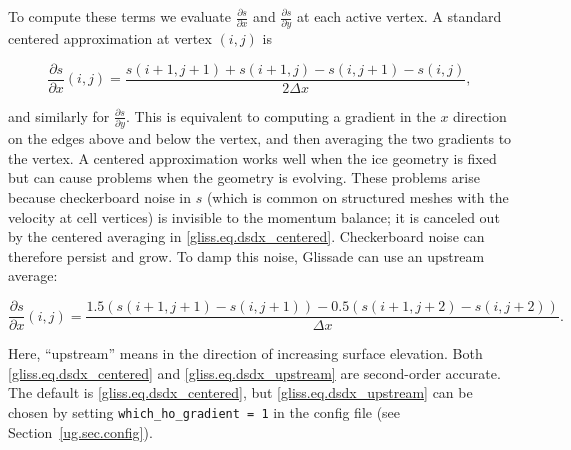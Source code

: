{\noindent
To compute these terms we evaluate $\frac{\partial s}{\partial x}$ and $\frac{\partial s}{\partial y}$
at each active vertex.  A standard centered approximation at vertex $(i,j)$ is

\begin{equation}
  \label{gliss.eq.dsdx_centered}
  \frac{\partial s}{\partial x}(i,j) = \frac{s(i+1,j+1)+s(i+1,j)-s(i,j+1)-s(i,j)}{2\Delta x},
\end{equation}

\noindent
and similarly for $\frac{\partial s}{\partial y}$. This is equivalent to computing a gradient
in the $x$ direction on the edges above and below the vertex, and then averaging the two 
gradients to the vertex.  A centered approximation works
well when the ice geometry is fixed but can cause problems when the geometry is evolving.
These problems arise because checkerboard noise in $s$ (which is common on structured meshes
with the velocity at cell vertices) is invisible to the momentum balance; 
it is canceled out by the centered averaging in \eqref{gliss.eq.dsdx_centered}.
Checkerboard noise can therefore persist and grow.  To damp this noise, Glissade 
can use an upstream average:

\begin{equation}
  \label{gliss.eq.dsdx_upstream}
  \frac{\partial s}{\partial x}(i,j) = \frac{1.5 (s(i+1,j+1) - s(i,j+1)) - 0.5 (s(i+1,j+2) - s(i,j+2))}{\Delta x}.
\end{equation}

\noindent
Here, ``upstream'' means in the direction of increasing surface elevation. Both \eqref{gliss.eq.dsdx_centered}
and \eqref{gliss.eq.dsdx_upstream} are second-order accurate.  The default is \eqref{gliss.eq.dsdx_centered},
but \eqref{gliss.eq.dsdx_upstream} can be chosen by setting \texttt{which\_ho\_gradient = 1} 
in the config file (see Section~\ref{ug.sec.config}).

}
